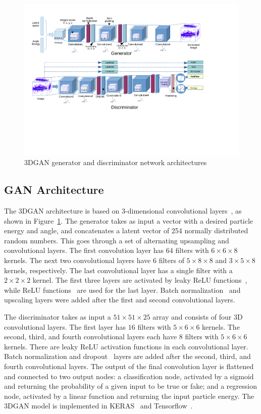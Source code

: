 \begin{figure}[htbp]
\centering
    \includegraphics[scale=0.65, trim={0cm 6cm 3.5cm 1.8cm}]{Images/Calo/gan_model_alt_upsampling.pdf}
    \caption{3DGAN generator and discriminator network architectures}
    \label{fig:GAN_arch}
\end{figure}

\subsection{GAN Architecture}
\label{sec:GANarch}

The 3DGAN architecture is based on 3-dimensional convolutional layers~\cite{conv}, as shown in Figure~\ref{fig:GAN_arch}. The generator takes as input a vector with a desired particle energy and angle, and concatenates a latent vector of 254 normally distributed random numbers. This goes through a set of alternating upsampling and convolutional layers. The first convolution layer has $64$ filters with $6 \times 6 \times 8$ kernels. The next two convolutional layers have $6$ filters of $5 \times 8 \times 8$ and $3 \times 5 \times 8$ kernels, respectively. The last convolutional layer has a single filter with a $2 \times 2 \times 2$ kernel. The first three layers are activated by leaky ReLU functions~\cite{LeakyReLU}, while ReLU functions~\cite{ReLU} are used for the last layer. Batch normalization~\cite{batchnorm} and upscaling layers were added after the first and second convolutional layers.

The discriminator takes as input a $51  \times 51  \times 25$ array and consists of four 3D convolutional layers. The first layer has $16$ filters with $5 \times 6 \times 6$ kernels. The second, third, and fourth convolutional layers each have $8$ filters with $5 \times 6 \times 6$ kernels. There are leaky ReLU activation functions in each convolutional layer. Batch normalization and dropout~\cite{dropout} layers are added after the second, third, and fourth convolutional layers. The output of the final convolution layer is flattened and connected to two output nodes: a classification node, activated by a sigmoid and returning the probability of a given input to be true or fake; and a regression node, activated by a linear function and returning the input particle energy.
The 3DGAN model is implemented in KERAS~\cite{keras} and Tensorflow~\cite{tensorflow2015-whitepaper}.

